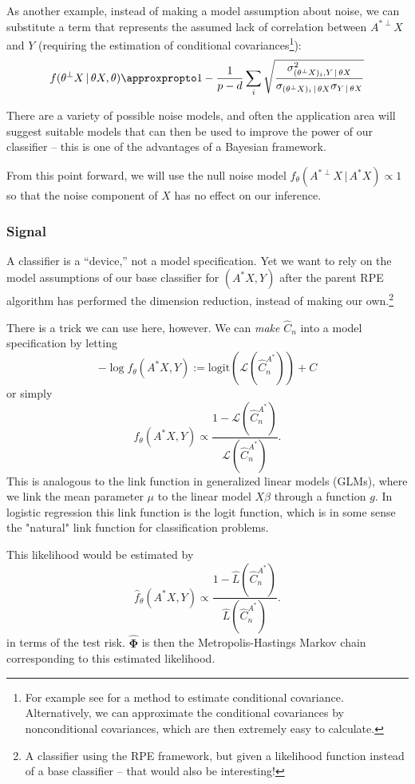 \documentclass{amsart}
\newcommand\risk{\mathcal{L}}
\begin{document}
As another example, instead of making a model assumption about noise, we can substitute a term that represents the assumed lack of correlation between $A^{*\perp}X$ and $Y$ (requiring the estimation of conditional covariances\footnote{For example see \cite{FY98} for a method to estimate conditional covariance. Alternatively, we can approximate the conditional covariances by nonconditional covariances, which are then extremely easy to calculate.}):
\[
f(\theta^\perp X\,|\,\theta X, \theta) \approxpropto 1 - \frac{1}{p-d} \sum_i \sqrt\frac{\sigma^2_{(\theta^\perp X)_i,Y\,|\,\theta X}}{\sigma_{(\theta^\perp X)_i\,|\,\theta X}\sigma_{Y\,|\,\theta X}}
\]

There are a variety of possible noise models, and often the application area will suggest suitable models that can then be used to improve the power of our classifier -- this is one of the advantages of a Bayesian framework.

From this point forward, we will use the null noise model $f_\theta(A^{*\perp} X \,|\,A^* X) \propto 1$ so that the noise component of $X$ has no effect on our inference.

\subsubsection{Signal}

A classifier is a ``device,'' not a model specification. Yet we want to rely on the model assumptions of our base classifier for $(A^*X,Y)$ after the parent RPE algorithm has performed the dimension reduction, instead of making our own.\footnote{A classifier using the RPE framework, but given a likelihood function instead of a base classifier -- that would also be interesting!}

There is a trick we can use here, however. We can \emph{make} $\hat C_n$ into a model specification by letting
\[
-\log f_\theta(A^*X,Y) := \mathrm{logit}\left( \risk(\hat C_n^{A^*}) \right)+C
\]
or simply
\[
f_\theta(A^*X,Y) \propto \frac{1-\risk(\hat C_n^{A^*})}{\risk(\hat C_n^{A^*})}.
\]
This is analogous to the link function in generalized linear models (GLMs), where we link the mean parameter $\mu$ to the linear model $X\beta$ through a function $g$. In logistic regression this link function is the logit function, which is in some sense the "natural" link function for classification problems.

This likelihood would be estimated by
\[
\hat f_\theta(A^*X,Y) \propto \frac{1-\hat L(\hat C_n^{A^*})}{\hat L(\hat C_n^{A^*})}.
\]
in terms of the test risk. $\hat{\bm{\Phi}}$ is then the Metropolis-Hastings Markov chain corresponding to this estimated likelihood.
\end{document}

